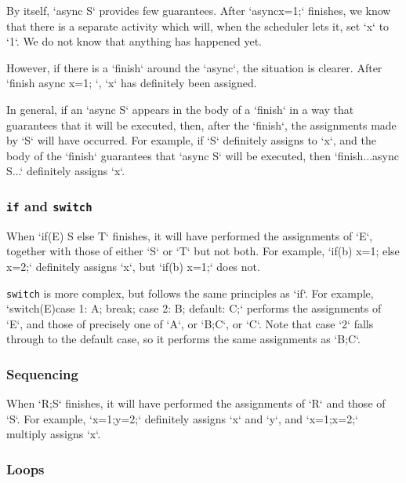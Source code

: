 By itself, \xcd`async S` provides few guarantees.  After \xcd`async{x=1;}`
finishes, we know that there is a separate activity which will, when the
scheduler lets it, set \xcd`x` to \xcd`1`.  We do not know that anything has
happened yet.

However, if there is a \xcd`finish` around the \xcd`async`, the situation is
clearer.  After \xcd`finish{ async{ x=1; }}`, \xcd`x` has definitely been
assigned.  

In general, if an \xcd`async S` appears in the body of a \xcd`finish` in a way
that guarantees that it will be executed, then, after the \xcd`finish`, the
assignments made by \xcd`S` will have occurred.  For example, if \xcd`S`
definitely assigns to \xcd`x`, and the body of the \xcd`finish` guarantees
that \xcd`async S` will be executed, then \xcd`finish{...async S...}`
definitely assigns \xcd`x`.



\subsubsection{{\tt if} and {\tt switch}}

When \xcd`if(E) S else T` finishes, it will have performed the assignments of
\xcd`E`, together with those of either \xcd`S` or \xcd`T` but not both.  For
example, \xcd`if(b) x=1; else x=2;` definitely assigns \xcd`x`,
but \xcd`if(b) x=1;` does not.

{\tt switch} is more complex, but follows the same principles as \xcd`if`.
For example, \xcd`switch(E){case 1: A; break; case 2: B; default: C;}`  
performs the assignments of \xcd`E`, and those of precisely one of \xcd`A`, or
\xcd`B;C`, or \xcd`C`.  Note that case \xcd`2` falls through to the default
case, so it performs the same assignments as \xcd`B;C`.

\subsubsection{Sequencing}

When \xcd`R;S` finishes, it will have performed the assignments of \xcd`R` and
those of \xcd`S`.  For example, \xcd`x=1;y=2;` definitely assigns \xcd`x` and
\xcd`y`, and \xcd`x=1;x=2;` multiply assigns \xcd`x`. 


\subsubsection{Loops}

